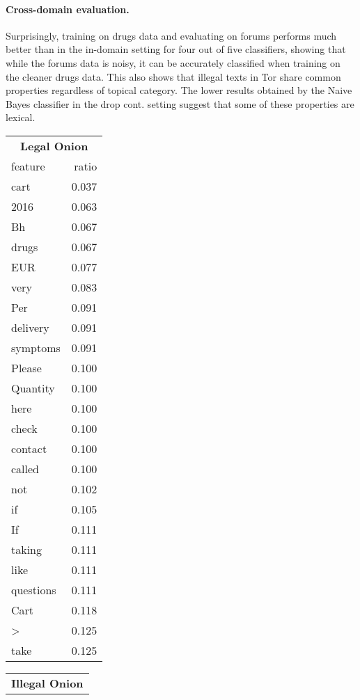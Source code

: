\documentclass[11pt,a4paper,table]{article}
\begin{document}
{\paragraph{Cross-domain evaluation.}

Surprisingly, training on drugs data and evaluating on forums performs much
better than %
in the in-domain setting
for four out of five classifiers,
showing that while the forums data is noisy, it can be accurately classified
when training on the cleaner drugs data. This also shows that illegal texts in Tor share common properties regardless of topical category.
The lower results obtained by the Naive Bayes classifier in the drop cont. setting suggest that some of these properties are lexical.

\begin{table}[t]
\small
\begin{tabular}{lr}
\multicolumn{2}{c}{\textbf{Legal Onion}}\\
feature & ratio\\
\hline
cart & 0.037\\
2016 & 0.063\\
Bh & 0.067\\
drugs & 0.067\\
EUR & 0.077\\
very & 0.083\\
Per & 0.091\\
delivery & 0.091\\
symptoms & 0.091\\
Please & 0.100\\
Quantity & 0.100\\
here & 0.100\\
check & 0.100\\
contact & 0.100\\
called & 0.100\\
not & 0.102\\
if & 0.105\\
If & 0.111\\
taking & 0.111\\
like & 0.111\\
questions & 0.111\\
Cart & 0.118\\
> & 0.125\\
take & 0.125\\
\end{tabular}
\begin{tabular}{lr}
\multicolumn{2}{c}{\textbf{Illegal Onion}}\\

\end{tabular}
\end{table}}
\end{document}
